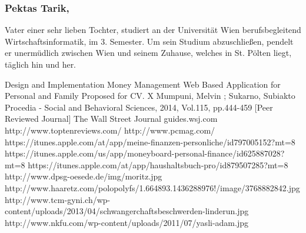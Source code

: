 \documentclass[runningheads,a4paper]{llncs}
\begin{document}
\subsubsection{Pektas Tarik,}
Vater einer sehr lieben Tochter, studiert an der Universität Wien berufsbegleitend Wirtschaftsinformatik, im 3. Semester. Um sein Studium abzuschließen, pendelt er unermüdlich zwischen Wien und seinem Zuhause, welches in St. Pölten liegt, täglich hin und her.


\begin{thebibliography}{1}
 Design and Implementation Money Management Web Based Application for Personal and Family Proposed for CV. X Mumpuni, Melvin ; Sukarno, Subiakto Procedia - Social and Behavioral Sciences, 2014, Vol.115, pp.444-459 [Peer Reviewed Journal] 
 The Wall Street Journal  guides.wsj.com 
 http://www.toptenreviews.com/
 http://www.pcmag.com/
 https://itunes.apple.com/at/app/meine-finanzen-personliche/id797005152?mt=8
https://itunes.apple.com/us/app/moneyboard-personal-finance/id625887028?mt=8
 https://itunes.apple.com/at/app/haushaltsbuch-pro/id879507285?mt=8
 http://www.dpsg-oesede.de/img/moritz.jpg
 http://www.haaretz.com/polopolyfs/1.664893.1436288976!/image/3768882842.jpg
 http://www.tcm-gyni.ch/wp-content/uploads/2013/04/schwangerchaftsbeschwerden-linderun.jpg
 http://www.nkfu.com/wp-content/uploads/2011/07/yasli-adam.jpg

\end{thebibliography}
\end{document}
